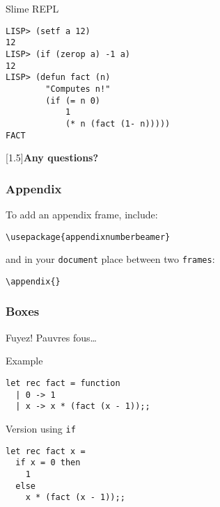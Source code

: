 \documentclass[aspectratio=169]{beamer}
\begin{document}
\begin{frame}[fragile]
  \begin{popup}{.75}
    \begin{macosdarkdialog}{Slime REPL}
      \begin{verbatim}
LISP> (setf a 12)
12
LISP> (if (zerop a) -1 a)
12
LISP> (defun fact (n)
        "Computes n!"
        (if (= n 0)
            1
            (* n (fact (1- n)))))
FACT
      \end{verbatim}
    \end{macosdarkdialog}
  \end{popup}
\end{frame}

\begin{standoutframe}
  \begin{center}
    \scalebox{1.5}[1.5]{\Huge \bfseries Any questions?}
  \end{center}
\end{standoutframe}

\appendix{}

\begin{frame}
  \nocite{*}
  
  
\end{frame}

\begin{frame}[fragile]
  \frametitle{Appendix}
  To add an appendix frame, include:

\begin{verbatim}
\usepackage{appendixnumberbeamer}
\end{verbatim}

  and in your \texttt{document} place between two \texttt{frames}:

\begin{verbatim}
\appendix{}
\end{verbatim}
\end{frame}

\begin{frame}[fragile]
  \frametitle{Boxes}
  \begin{alertblock}{Fuyez!}
    Pauvres fous\ldots
  \end{alertblock}
  \begin{exampleblock}{Example}
\begin{verbatim}
let rec fact = function
  | 0 -> 1
  | x -> x * (fact (x - 1));;
\end{verbatim}
  \end{exampleblock}
  \begin{block}{Version using \texttt{if}}
 \begin{verbatim}
let rec fact x =
  if x = 0 then
    1
  else
    x * (fact (x - 1));;
\end{verbatim}
  \end{block}
\end{frame}
\end{document}
